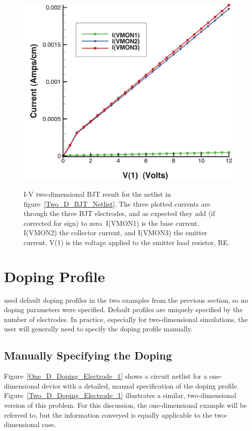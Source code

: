 \begin{figure}
  \centering
  \scalebox{0.5}
  {\includegraphics[]{twoDresultC}}
  \caption[I-V two-dimensional BJT result for the netlist in figure~\ref{Two_D_BJT_Netlist}]
  {I-V two-dimensional BJT result for the netlist in figure~\ref{Two_D_BJT_Netlist}.  
The three plotted currents are through the three BJT electrodes, and as expected they add (if corrected for sign) to zero.  I(VMON1) is the base current, I(VMON2) the collector current, and I(VMON3) the emitter current.  V(1) is the voltage applied to the emitter load resistor, RE.  
\label{twoD_BJTResC}}
\end{figure}

\section{Doping Profile} \label{PDE_Doping}
\Xyce{} used default doping profiles in the two examples from the previous section, so no doping parameters were 
specified.  Default profiles are uniquely specified by the number
of electrodes.  In practice, especially for two-dimensional simulations, the user will generally need to specify the doping profile manually.

\subsection{Manually Specifying the Doping} \label{Manual_Doping}
Figure~\ref{One_D_Doping_Electrode_1} shows a circuit netlist for a one-dimensional device with 
a detailed, manual specification of the doping
profile.  Figure~\ref{Two_D_Doping_Electrode_1} illustrates a similar, two-dimensional version of this problem. For this
discussion, the one-dimensional example will be referred to, but the information conveyed is equally applicable to the two-dimensional case.

